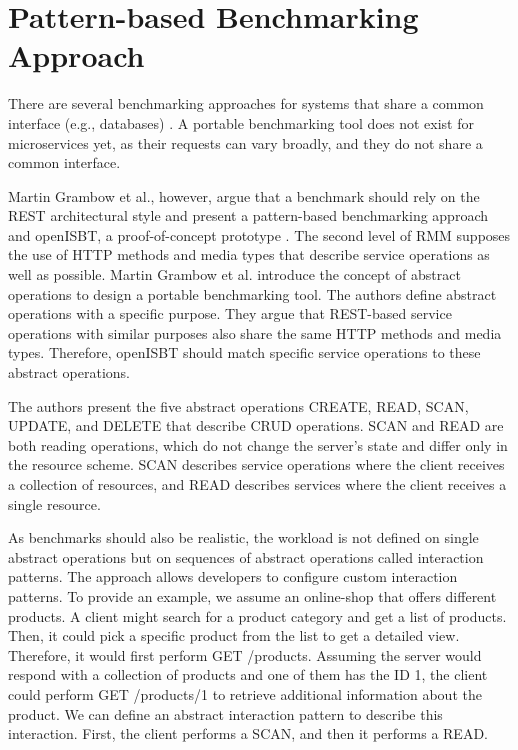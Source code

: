 \section{Pattern-based Benchmarking Approach}
\label{sec:bg_pattern_based_approach}

There are several benchmarking approaches for systems that share a common interface (e.g., databases) \cite{RelWor:DB_NDBench, YCSB+T, BenchFoundary, RelWor:DB_COSBench, RelWork:OLTP, RelWork:CloudDBFramework, YCSB++, RelWor:VM_Borhani, RelWor:VM_Kejiang, RelWor:VM_Varghese, RelWor:VM_Zaitsev, RelWor:VM_Carpio}. A portable benchmarking tool does not exist for microservices yet, as their requests can vary broadly, and they do not share a common interface.

Martin  Grambow et al., however, argue that a benchmark should rely on the REST architectural style and present a pattern-based benchmarking approach and openISBT, a proof-of-concept prototype \cite{paper_grambow_benchmarking_microservices}. The second level of RMM supposes the use of HTTP methods and media types that describe service operations as well as possible. Martin Grambow et al. introduce the concept of abstract operations to design a portable benchmarking tool. The authors define abstract operations with a specific purpose. They argue that REST-based service operations with similar purposes also share the same HTTP methods and media types.  Therefore, openISBT should match specific service operations to these abstract operations. 

The authors present the five abstract operations CREATE, READ, SCAN, UPDATE, and DELETE that describe CRUD operations. SCAN and READ are both reading operations, which do not change the server's state and differ only in the resource scheme. SCAN describes service operations where the client receives a collection of resources, and READ describes services where the client receives a single resource.

As benchmarks should also be realistic, the workload is not defined on single abstract operations but on sequences of abstract operations called interaction patterns. The approach allows developers to configure custom interaction patterns. To provide an example, we assume an online-shop that offers different products.  A client might search for a product category and get a list of products. Then, it could pick a specific product from the list to get a detailed view. Therefore, it would first perform GET /products. Assuming the server would respond with a collection of products and one of them has the ID 1, the client could perform GET /products/1 to retrieve additional information about the product. We can define an abstract interaction pattern to describe this interaction. First, the client performs a SCAN, and then it performs a READ. 


